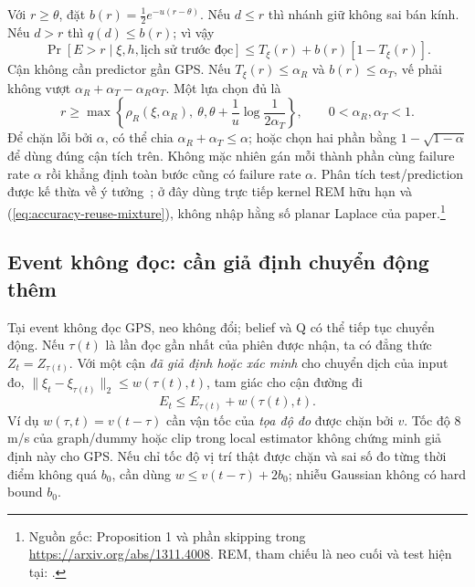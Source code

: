 Với $r\geq\theta$, đặt $b(r)=\tfrac12 e^{-u(r-\theta)}$. Nếu $d\leq r$
thì nhánh giữ không sai bán kính. Nếu $d>r$ thì $q(d)\leq b(r)$; vì vậy
\begin{equation}
 \Pr[E>r\mid\xi,h,\text{lịch sử trước đọc}]
 \leq T_\xi(r)+b(r)[1-T_\xi(r)].
 \label{eq:accuracy-reuse-uniform-h}
\end{equation}
Cận không cần predictor gần GPS. Nếu $T_\xi(r)\leq\alpha_R$ và
$b(r)\leq\alpha_T$, vế phải không vượt
$\alpha_R+\alpha_T-\alpha_R\alpha_T$. Một lựa chọn đủ là
\begin{equation}
 r\geq\max\!\left\{\rho_R(\xi,\alpha_R),\ \theta,
                   \theta+\frac1u\log\frac1{2\alpha_T}\right\},
 \qquad 0<\alpha_R,\alpha_T<1.
 \label{eq:accuracy-read-radius}
\end{equation}
Để chặn lỗi bởi $\alpha$, có thể chia $\alpha_R+\alpha_T\leq\alpha$;
hoặc chọn hai phần bằng $1-\sqrt{1-\alpha}$ để dùng đúng cận tích trên.
Không mặc nhiên gán mỗi thành phần cùng failure rate $\alpha$ rồi khẳng
định toàn bước cũng có failure rate $\alpha$. Phân tích test/prediction
được kế thừa về ý tưởng~\cite{chatzikokolakis2014predictive}; ở đây dùng
trực tiếp kernel REM hữu hạn và (\ref{eq:accuracy-reuse-mixture}), không
nhập hằng số planar Laplace của paper.\footnote{Nguồn gốc: Proposition 1
và phần skipping trong \url{https://arxiv.org/abs/1311.4008}. REM, tham
chiếu là neo cuối và test hiện tại: .}

\subsection{Event không đọc: cần giả định chuyển động thêm}
\label{sec:formal-no-read-accuracy}

Tại event không đọc GPS, neo không đổi; belief và Q có thể tiếp tục chuyển
động. Nếu $\tau(t)$ là lần đọc gần nhất của phiên được nhận, ta có đẳng
thức $Z_t=Z_{\tau(t)}$. Với một cận \emph{đã giả định hoặc xác minh} cho
chuyển dịch của input đo,
$\|\xi_t-\xi_{\tau(t)}\|_2\leq w(\tau(t),t)$, tam giác cho cận đường đi
\begin{equation}
 E_t\leq E_{\tau(t)}+w(\tau(t),t).
 \label{eq:accuracy-no-read-pathwise}
\end{equation}
Ví dụ $w(\tau,t)=v(t-\tau)$ cần vận tốc của \emph{tọa độ đo} được chặn
bởi $v$. Tốc độ 8 m/s của graph/dummy hoặc clip trong local estimator không
chứng minh giả định này cho GPS. Nếu chỉ tốc độ vị trí thật được chặn và
sai số đo từng thời điểm không quá $b_0$, cần dùng
$w\leq v(t-\tau)+2b_0$; nhiễu Gaussian không có hard bound $b_0$.


